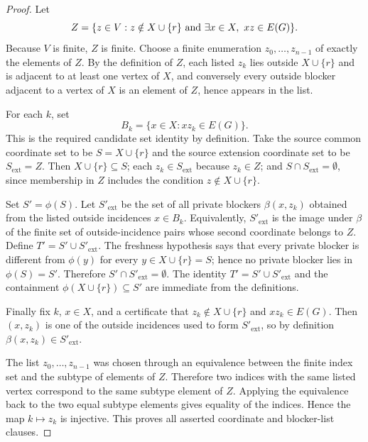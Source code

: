 \begin{proof}
Let
\[
  Z=\{z\in V:z\notin X\cup\{r\}\hbox{ and }
      \exists x\in X,\ xz\in E(G)\}.
\]
Because \(V\) is finite, \(Z\) is finite.  Choose a finite enumeration
\(z_0,\ldots,z_{n-1}\) of exactly the elements of \(Z\).  By the definition of
\(Z\), each listed \(z_k\) lies outside \(X\cup\{r\}\) and is adjacent to at
least one vertex of \(X\), and conversely every outside blocker adjacent to a
vertex of \(X\) is an element of \(Z\), hence appears in the list.

For each \(k\), set
\[
  B_k=\{x\in X:xz_k\in E(G)\}.
\]
This is the required candidate set identity by definition.  Take the source
common coordinate set to be \(S=X\cup\{r\}\) and the source extension
coordinate set to be \(S_{\mathrm{ext}}=Z\).  Then \(X\cup\{r\}\subseteq S\);
each \(z_k\in S_{\mathrm{ext}}\) because \(z_k\in Z\); and
\(S\cap S_{\mathrm{ext}}=\emptyset\), since membership in \(Z\) includes the
condition \(z\notin X\cup\{r\}\).

Set \(S'=\phi(S)\).  Let \(S'_{\mathrm{ext}}\) be the set of all private
blockers \(\beta(x,z_k)\) obtained from the listed outside incidences
\(x\in B_k\).  Equivalently, \(S'_{\mathrm{ext}}\) is the image under
\(\beta\) of the finite set of outside-incidence pairs whose second
coordinate belongs to \(Z\).  Define \(T'=S'\cup S'_{\mathrm{ext}}\).  The
freshness hypothesis says that every private blocker is different from
\(\phi(y)\) for every \(y\in X\cup\{r\}=S\); hence no private blocker lies in
\(\phi(S)=S'\).  Therefore \(S'\cap S'_{\mathrm{ext}}=\emptyset\).  The
identity \(T'=S'\cup S'_{\mathrm{ext}}\) and the containment
\(\phi(X\cup\{r\})\subseteq S'\) are immediate from the definitions.

Finally fix \(k\), \(x\in X\), and a certificate that \(z_k\notin X\cup\{r\}\)
and \(xz_k\in E(G)\).  Then \((x,z_k)\) is one of the outside incidences used
to form \(S'_{\mathrm{ext}}\), so by definition
\(\beta(x,z_k)\in S'_{\mathrm{ext}}\).

The list \(z_0,\ldots,z_{n-1}\) was chosen through an equivalence between the
finite index set and the subtype of elements of \(Z\).  Therefore two indices
with the same listed vertex correspond to the same subtype element of \(Z\).
Applying the equivalence back to the two equal subtype elements gives equality
of the indices.  Hence the map \(k\mapsto z_k\) is injective.  This proves all
asserted coordinate and blocker-list clauses.
\end{proof}
